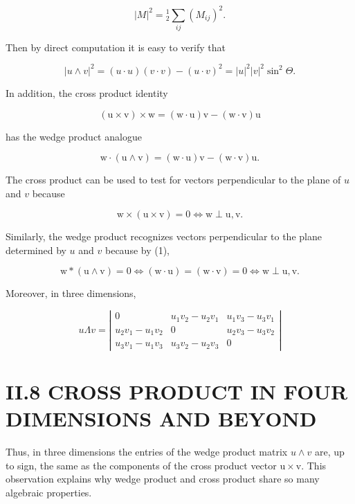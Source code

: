 \begin{CJK}{UTF8}{gbsn}
$$
|M|^{2}={ }_{2}^{1} \sum_{i j}\left(M_{i j}\right)^{2} .
$$

Then by direct computation it is easy to verify that

$$
|u \wedge v|^{2}=(u \cdot u)(v \cdot v)-(u \cdot v)^{2}=|u|^{2}|v|^{2} \sin ^{2} \Theta .
$$

In addition, the cross product identity

$$
(\mathrm{u} \times \mathrm{v}) \times \mathrm{w}=(\mathrm{w} \cdot \mathrm{u}) \mathrm{v}-(\mathrm{w} \cdot \mathrm{v}) \mathrm{u}
$$

has the wedge product analogue

$$
\mathrm{w} \cdot(\mathrm{u} \wedge \mathrm{v})=(\mathrm{w} \cdot \mathrm{u}) \mathrm{v}-(\mathrm{w} \cdot \mathrm{v}) \mathrm{u} .
$$

The cross product can be used to test for vectors perpendicular to the plane of $u$ and $v$ because

$$
\mathrm{w} \times(\mathrm{u} \times \mathrm{v})=0 \Leftrightarrow \mathrm{w} \perp \mathrm{u}, \mathrm{v} .
$$

Similarly, the wedge product recognizes vectors perpendicular to the plane determined by $u$ and $v$ because by (1),

$$
\mathrm{w} *(\mathrm{u} \wedge \mathrm{v})=0 \Leftrightarrow(\mathrm{w} \cdot \mathrm{u})=(\mathrm{w} \cdot \mathrm{v})=0 \Leftrightarrow \mathrm{w} \perp \mathrm{u}, \mathrm{v} .
$$

Moreover, in three dimensions,

$$
u \Lambda v=\left|\begin{array}{ccc}
0 & u_{1} v_{2}-u_{2} v_{1} & u_{1} v_{3}-u_{3} v_{1} \\
u_{2} v_{1}-u_{1} v_{2} & 0 & u_{2} v_{3}-u_{3} v_{2} \\
u_{3} v_{1}-u_{1} v_{3} & u_{3} v_{2}-u_{2} v_{3} & 0
\end{array}\right|
$$

\section{II.8 CROSS PRODUCT IN FOUR DIMENSIONS AND BEYOND}
Thus, in three dimensions the entries of the wedge product matrix $u \wedge v$ are, up to sign, the same as the components of the cross product vector $\mathrm{u} \times \mathrm{v}$. This observation explains why wedge product and cross product share so many algebraic properties.


\end{CJK}
